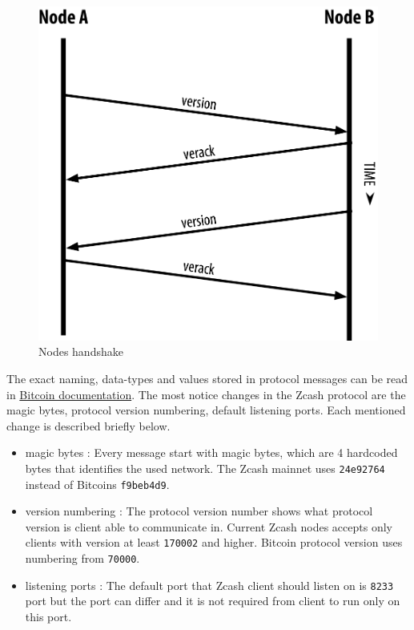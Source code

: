 \documentclass[11pt]{article}
\begin{document}
\begin{figure}[htbp]
\centering
\includegraphics[width=.9\linewidth]{handshake.png}
\caption{\label{fig-handshake}Nodes handshake}
\end{figure}
The exact naming, data-types and values stored in protocol messages can be read in \href{https://developer.bitcoin.org/reference/p2p\_networking.html}{Bitcoin documentation}.
The most notice changes in the Zcash protocol are the magic bytes, protocol version numbering, default listening ports. Each mentioned change is described briefly below.
\begin{itemize}
\item magic bytes : Every message start with magic bytes, which are 4 hardcoded bytes that identifies the used network. The Zcash mainnet uses \texttt{24e92764} instead of Bitcoins \texttt{f9beb4d9}.
\item version numbering : The protocol version number shows what protocol version is client able to communicate in. Current Zcash nodes accepts only clients with version at least \texttt{170002} and higher. Bitcoin protocol version uses numbering from \texttt{70000}.
\item listening ports : The default port that Zcash client should listen on is \texttt{8233} port but the port can differ and it is not required from client to run only on this port.
\end{itemize}
\end{document}
